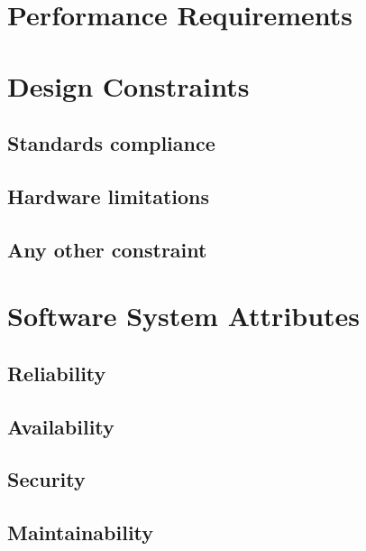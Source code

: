 \documentclass{Configuration_Files/PoliMi3i_thesis}
\begin{document}
    \section{Performance Requirements}\label{sec:performance_requirements}


    \section{Design Constraints}\label{sec:design_constraints}

    \subsection{Standards compliance}\label{subsec:standards_compliance}

    \subsection{Hardware limitations}\label{subsec:hardware_limitations}

    \subsection{Any other constraint}\label{subsec:any_other_constraint}


    \section{Software System Attributes}\label{sec:software_system_attributes}

    \subsection{Reliability}\label{subsec:reliability}

    \subsection{Availability}\label{subsec:availability}

    \subsection{Security}\label{subsec:security}

    \subsection{Maintainability}\label{subsec:maintainability}
\end{document}
